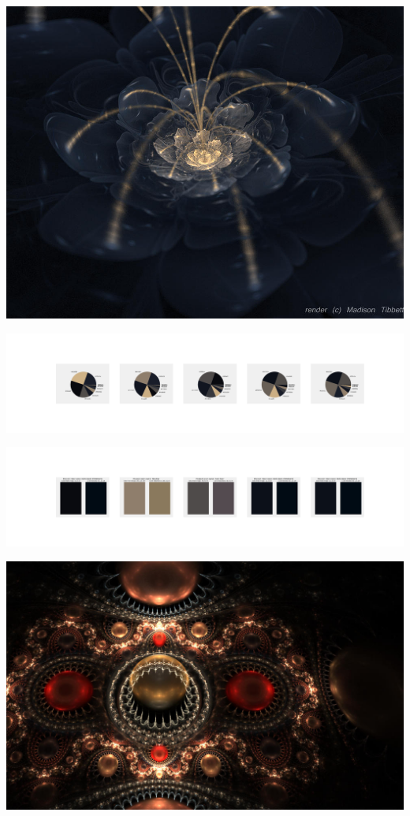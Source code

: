 \documentclass[11pt]{article}
\begin{document}
\begin{landscape}
    \begin{center}
    \includegraphics[width=\textwidth]{./nbimg/file (4).jpg}
    \end{center}

    \begin{center}
    \includegraphics[width=250mm]{./nbimg/pie-333.jpg}
    \end{center}

    \begin{center}
    \includegraphics[width=250mm]{./nbimg/peak-333.jpg}
    \end{center}
    

    \begin{center}
    \includegraphics[width=\textwidth]{./nbimg/file (40).jpg}
    \end{center}


\end{landscape}
\end{document}
